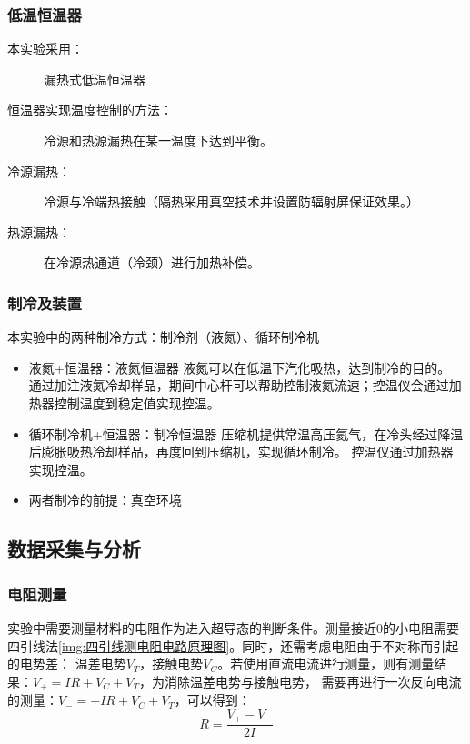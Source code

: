 \documentclass{spaexp}
\begin{document}
            \subsubsection{低温恒温器}
                \begin{description}
                    \item[本实验采用：]漏热式低温恒温器
                    \item[恒温器实现温度控制的方法：]冷源和热源漏热在某一温度下达到平衡。
                    \item[冷源漏热：]冷源与冷端热接触（隔热采用真空技术并设置防辐射屏保证效果。）
                    \item[热源漏热：]在冷源热通道（冷颈）进行加热补偿。
                \end{description}
                
            \subsubsection{制冷及装置}
                本实验中的两种制冷方式：制冷剂（液氮）、循环制冷机
                \begin{itemize}
                    \item 液氮+恒温器：液氮恒温器
                    液氮可以在低温下汽化吸热，达到制冷的目的。
                    通过加注液氮冷却样品，期间中心杆可以帮助控制液氮流速；控温仪会通过加热器控制温度到稳定值实现控温。
                    \item 循环制冷机+恒温器：制冷恒温器
                    压缩机提供常温高压氦气，在冷头经过降温后膨胀吸热冷却样品，再度回到压缩机，实现循环制冷。
                    控温仪通过加热器实现控温。
                    \item 两者制冷的前提：真空环境
                \end{itemize}
        \subsection{数据采集与分析}
            \subsubsection{电阻测量}
            实验中需要测量材料的电阻作为进入超导态的判断条件。测量接近0的小电阻需要四引线法\autoref{img:四引线测电阻电路原理图}。同时，还需考虑电阻由于不对称而引起的电势差：
            温差电势$V_T$，接触电势$V_C$。若使用直流电流进行测量，则有测量结果：$V_+ = IR + V_C + V_T$，为消除温差电势与接触电势，
            需要再进行一次反向电流的测量：$V_- = -IR + V_C + V_T$，可以得到：
            \begin{equation}
                R = \frac{V_+ - V_-}{2I}
            \end{equation}
\end{document}
